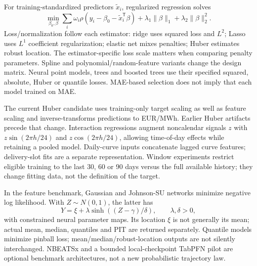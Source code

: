 For training-standardized predictors $\tilde x_i$, regularized regression solves
\begin{equation}\label{eq:price-regression}
 \min_{\beta_0,\beta}\sum_i\omega_i\rho(y_i-\beta_0-\tilde x_i^{\mathsf T}\beta)
       +\lambda_1\|\beta\|_1+\lambda_2\|\beta\|_2^2.
\end{equation}
Loss/normalization follow each estimator: ridge uses squared loss and $L^2$;
Lasso uses $L^1$ coefficient regularization; elastic net mixes penalties;
Huber estimates robust location. The estimator-specific loss scale matters when
comparing penalty parameters. Spline and polynomial/random-feature variants
change the design matrix. Neural point models, trees and boosted trees use their
specified squared, absolute, Huber or quantile losses. MAE-based selection does
not imply that each model trained on MAE.

The current Huber candidate uses training-only target scaling as well as feature
scaling and inverse-transforms predictions to EUR/MWh. Earlier Huber artifacts
precede that change. Interaction regressions augment noncalendar signals $z$
with $z\sin(2\pi h/24)$ and $z\cos(2\pi h/24)$, allowing time-of-day effects
while retaining a pooled model. Daily-curve inputs concatenate lagged curve
features; delivery-slot fits are a separate representation. Window experiments
restrict eligible training to the last 30, 60 or 90 days versus the full
available history; they change fitting data, not the definition of the target.

In the feature benchmark, Gaussian and Johnson-SU networks minimize negative
log likelihood. With $Z\sim N(0,1)$, the latter has
\begin{equation}
 Y=\xi+\lambda\sinh((Z-\gamma)/\delta),\qquad\lambda,\delta>0,
\end{equation}
with constrained neural parameter maps. Its location $\xi$ is not generally
its mean; actual mean, median, quantiles and PIT are returned separately.
Quantile models minimize pinball loss; mean/median/robust-location outputs are
not silently interchanged. NBEATSx and a bounded local-checkpoint TabPFN pilot
are optional benchmark architectures, not a new probabilistic trajectory law.

